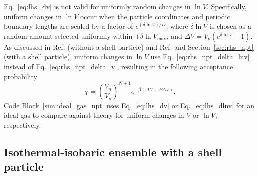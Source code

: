 \documentclass[
  9pt,
  bestpractices,
]{livecoms}
\begin{document}
Eq.~\ref{eq:lhs_dv} is not valid for uniformly random changes in $\ln V$.
Specifically, uniform changes in $\ln V$ occur when the particle coordinates and periodic boundary lengths are scaled by a factor of $e^{(\delta\ln V)/D}$, where $\delta\ln V$ is chosen as a random amount selected uniformly within $\pm\delta\ln V_{\mathrm{max}}$, and $\Delta V = V_o(e^{\delta\ln V}-1)$.
As discussed in Ref. \cite{frenkel_understanding_2002} (without a shell particle) and Ref. \cite{corti_monte_2002} and Section~\ref{sec:rhs_npt} (with a shell particle), uniform changes in $\ln V$ use Eq.~\ref{eq:rhs_npt_delta_lnv} instead of Eq.~\ref{eq:rhs_npt_delta_v}, resulting in the following acceptance probability
\begin{equation}
\chi=\left(\frac{V_n}{V_o}\right)^{N+1}e^{-\beta(\Delta U + P\Delta V)}.
\label{eq:lhs_dlnv}
\end{equation}
Code Block~\ref{sim:ideal_gas_npt} uses Eq.~\ref{eq:lhs_dv} or Eq.~\ref{eq:lhs_dlnv} for an ideal gas to compare against theory for uniform changes in $V$ or $\ln V$, respectively.

\begin{figure}

\end{figure}

\subsection{\label{sec:rhs_npt_no_shell}Isothermal-isobaric ensemble with a shell particle}
\end{document}
